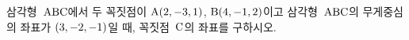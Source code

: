 삼각형~$\mathrm{ABC}$에서 두 꼭짓점이 $\mathrm{A}(2{,}\mkern3mu\mathopen{}-3{,}\mkern3mu\mathopen{}1)$, $\mathrm{B}(4{,}\mkern3mu\mathopen{}-1{,}\mkern3mu\mathopen{}2)$이고 삼각형~$\mathrm{ABC}$의 무게중심의 좌표가 $(3{,}\mkern3mu\mathopen{}-2{,}\mkern3mu\mathopen{}-1)$일 때, 꼭짓점~$\mathrm{C}$의 좌표를 구하시오.
